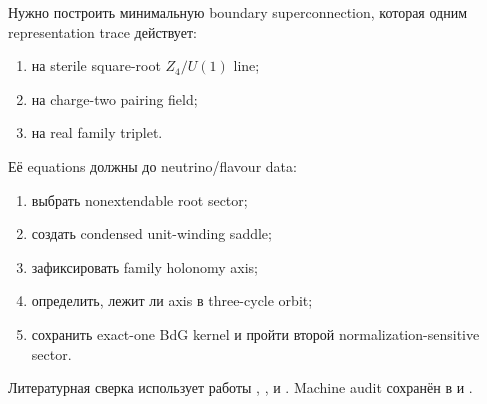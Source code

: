 \begin{protocol}
Нужно построить минимальную boundary superconnection, которая одним
representation trace действует:
\begin{enumerate}
 \item на sterile square-root \(Z_4/U(1)\) line;
 \item на charge-two pairing field;
 \item на real family triplet.
\end{enumerate}
Её equations должны до neutrino/flavour data:
\begin{enumerate}
 \item выбрать nonextendable root sector;
 \item создать condensed unit-winding saddle;
 \item зафиксировать family holonomy axis;
 \item определить, лежит ли axis в three-cycle orbit;
 \item сохранить exact-one BdG kernel и пройти второй
 normalization-sensitive sector.
\end{enumerate}
\end{protocol}

Литературная сверка использует работы
, ,
 и .
Machine audit сохранён в
 и
.